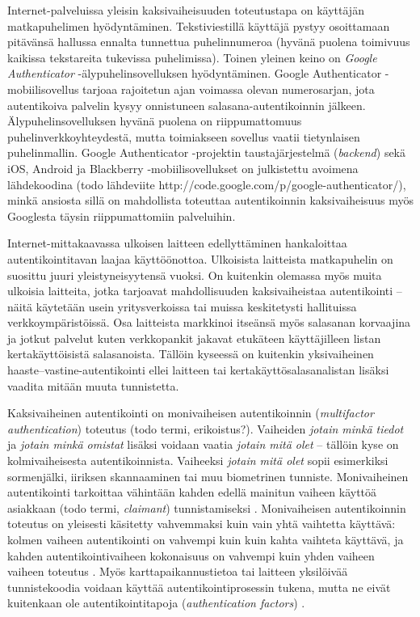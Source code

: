 \documentclass[finnish,gradu]{tktltiki}
\begin{document}
  Internet-palveluissa yleisin kaksivaiheisuuden toteutustapa on käyttäjän matkapuhelimen hyödyntäminen. Tekstiviestillä käyttäjä pystyy osoittamaan pitävänsä hallussa ennalta tunnettua puhelinnumeroa (hyvänä puolena toimivuus kaikissa tekstareita tukevissa puhelimissa). Toinen yleinen keino on \emph{Google Authenticator} -älypuhelinsovelluksen hyödyntäminen. Google Authenticator -mobiilisovellus tarjoaa rajoitetun ajan voimassa olevan numerosarjan, jota autentikoiva palvelin kysyy onnistuneen salasana-autentikoinnin jälkeen. Älypuhelinsovelluksen hyvänä puolena on riippumattomuus puhelinverkkoyhteydestä, mutta toimiakseen sovellus vaatii tietynlaisen puhelinmallin. Google Authenticator -projektin taustajärjestelmä (\emph{backend}) sekä iOS, Android ja Blackberry -mobiilisovellukset on julkistettu avoimena lähdekoodina (todo lähdeviite http://code.google.com/p/google-authenticator/), minkä ansiosta sillä on mahdollista toteuttaa autentikoinnin kaksivaiheisuus myös Googlesta täysin riippumattomiin palveluihin.

  Internet-mittakaavassa ulkoisen laitteen edellyttäminen hankaloittaa autentikointitavan laajaa käyttöönottoa. Ulkoisista laitteista matkapuhelin on suosittu juuri yleistyneisyytensä vuoksi. On kuitenkin olemassa myös muita ulkoisia laitteita, jotka tarjoavat mahdollisuuden kaksivaiheistaa autentikointi -- näitä käytetään usein yritysverkoissa tai muissa keskitetysti hallituissa verkkoympäristöissä. Osa laitteista markkinoi itseänsä myös salasanan korvaajina ja jotkut palvelut kuten verkkopankit jakavat etukäteen käyttäjilleen listan kertakäyttöisistä salasanoista. Tällöin kyseessä on kuitenkin yksivaiheinen haaste--vastine-autentikointi ellei laitteen tai kertakäyttösalasanalistan lisäksi vaadita mitään muuta tunnistetta.

  Kaksivaiheinen autentikointi on monivaiheisen autentikoinnin (\emph{multifactor authentication}) toteutus (todo termi, erikoistus?).
  Vaiheiden \emph{jotain minkä tiedot} ja \emph{jotain minkä omistat} lisäksi voidaan vaatia \emph{jotain mitä olet} -- tällöin kyse on kolmivaiheisesta autentikoinnista. Vaiheeksi \emph{jotain mitä olet} sopii esimerkiksi sormenjälki, iiriksen skannaaminen tai muu biometrinen tunniste. Monivaiheinen autentikointi tarkoittaa vähintään kahden edellä mainitun vaiheen käyttöä asiakkaan (todo termi, \emph{claimant}) tunnistamiseksi \cite{NIST_SP800-63-1}. Monivaiheisen autentikoinnin toteutus on yleisesti käsitetty vahvemmaksi kuin vain yhtä vaihtetta käyttävä: kolmen vaiheen autentikointi on vahvempi kuin kuin kahta vaihteta käyttävä, ja kahden autentikointivaiheen kokonaisuus on vahvempi kuin yhden vaiheen vaiheen toteutus \cite{NIST_SP800-63-1}. Myös karttapaikannustietoa tai laitteen yksilöivää tunnistekoodia voidaan käyttää autentikointiprosessin tukena, mutta ne eivät kuitenkaan ole autentikointitapoja (\emph{authentication factors}) \cite{NIST_SP800-63-1}.
\end{document}
